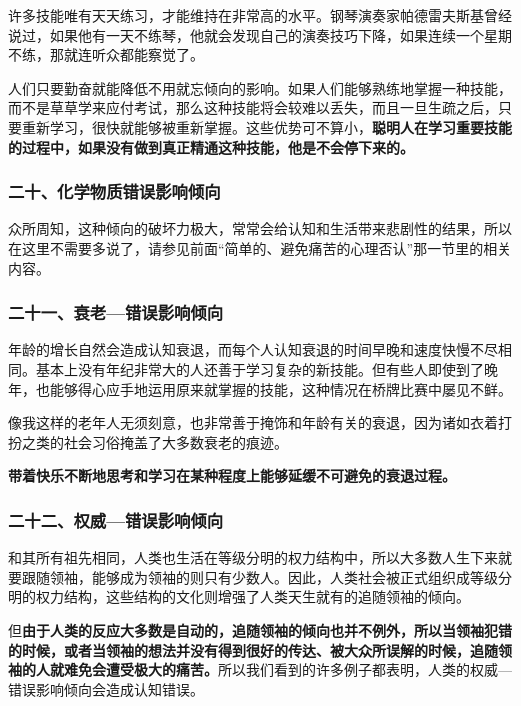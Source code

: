 许多技能唯有天天练习，才能维持在非常高的水平。钢琴演奏家帕德雷夫斯基曾经说过，如果他有一天不练琴，他就会发现自己的演奏技巧下降，如果连续一个星期不练，那就连听众都能察觉了。
\par

人们只要勤奋就能降低不用就忘倾向的影响。如果人们能够熟练地掌握一种技能，而不是草草学来应付考试，那么这种技能将会较难以丢失，而且一旦生疏之后，只要重新学习，很快就能够被重新掌握。这些优势可不算小，\textbf{聪明人在学习重要技能的过程中，如果没有做到真正精通这种技能，他是不会停下来的。}
\par

\subsubsection*{二十、化学物质错误影响倾向}

众所周知，这种倾向的破坏力极大，常常会给认知和生活带来悲剧性的结果，所以在这里不需要多说了，请参见前面“简单的、避免痛苦的心理否认”那一节里的相关内容。
\par

\subsubsection*{二十一、衰老—错误影响倾向}

年龄的增长自然会造成认知衰退，而每个人认知衰退的时间早晚和速度快慢不尽相同。基本上没有年纪非常大的人还善于学习复杂的新技能。但有些人即使到了晚年，也能够得心应手地运用原来就掌握的技能，这种情况在桥牌比赛中屡见不鲜。
\par

像我这样的老年人无须刻意，也非常善于掩饰和年龄有关的衰退，因为诸如衣着打扮之类的社会习俗掩盖了大多数衰老的痕迹。
\par

\textbf{带着快乐不断地思考和学习在某种程度上能够延缓不可避免的衰退过程。}
\par

\subsubsection*{二十二、权威—错误影响倾向}

和其所有祖先相同，人类也生活在等级分明的权力结构中，所以大多数人生下来就要跟随领袖，能够成为领袖的则只有少数人。因此，人类社会被正式组织成等级分明的权力结构，这些结构的文化则增强了人类天生就有的追随领袖的倾向。
\par

但\textbf{由于人类的反应大多数是自动的，追随领袖的倾向也并不例外，所以当领袖犯错的时候，或者当领袖的想法并没有得到很好的传达、被大众所误解的时候，追随领袖的人就难免会遭受极大的痛苦。}所以我们看到的许多例子都表明，人类的权威—错误影响倾向会造成认知错误。
\par

